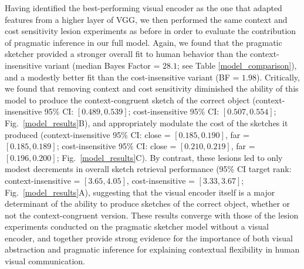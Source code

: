\documentclass[9pt,twocolumn,twoside]{pnas-new}
\begin{document}
Having identified the best-performing visual encoder as the one that adapted features from a higher layer of VGG, we then performed the same context and cost sensitivity lesion experiments as before in order to evaluate the contribution of pragmatic inference in our full model. 
Again, we found that the pragmatic sketcher provided a stronger overall fit to human behavior than the context-insensitive variant (median Bayes Factor = $28.1$; see Table \ref{model_comparison}), and a modestly better fit than the cost-insensitive variant (BF = $1.98$). 
Critically, we found that removing context and cost sensitivity diminished the ability of this model to produce the context-congruent sketch of the correct object (context-insensitive 95\% CI: $[0.489, 0.539]$; cost-insensitive 95\% CI: $[0.507, 0.554]$; Fig.~\ref{model_results}B), and appropriately modulate the cost of the sketches it produced (context-insensitive 95\% CI: close = $[0.185, 0.190]$, far = $[0.185, 0.189]$; cost-insensitive 95\% CI: close = $[0.210, 0.219]$, far = $[0.196, 0.200]$; Fig.~\ref{model_results}C). 
By contrast, these lesions led to only modest decrements in overall sketch retrieval performance (95\% CI target rank: context-insensitive = $[3.65, 4.05]$, cost-insensitive = $[3.33, 3.67]$;  Fig.~\ref{model_results}A), suggesting that the visual encoder itself is a major determinant of the ability to produce sketches of the correct object, whether or not the context-congruent version.
These results converge with those of the lesion experiments conducted on the pragmatic sketcher model without a visual encoder, and together provide strong evidence for the importance of both visual abstraction and pragmatic inference for explaining contextual flexibility in human visual communication. 
\end{document}
